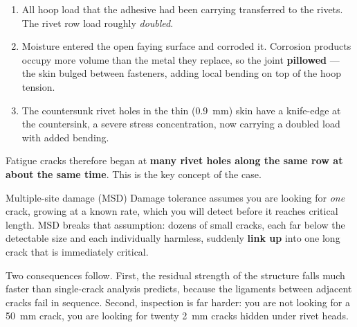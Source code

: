 \documentclass[11pt,a4paper]{article}
\begin{document}
\begin{enumerate}[nosep]
  \item All hoop load that the adhesive had been carrying transferred to the rivets. The rivet row load roughly \emph{doubled}.
  \item Moisture entered the open faying surface and corroded it. Corrosion products occupy more volume than the metal they replace, so the joint \textbf{pillowed} --- the skin bulged between fasteners, adding local bending on top of the hoop tension.
  \item The countersunk rivet holes in the thin (\SI{0.9}{mm}) skin have a knife-edge at the countersink, a severe stress concentration, now carrying a doubled load with added bending.
\end{enumerate}

Fatigue cracks therefore began at \textbf{many rivet holes along the same row at about the same time}. This is the key concept of the case.

\begin{aerobox}{Multiple-site damage (MSD)}
Damage tolerance assumes you are looking for \emph{one} crack, growing at a known rate, which you will detect before it reaches critical length. MSD breaks that assumption: dozens of small cracks, each far below the detectable size and each individually harmless, suddenly \textbf{link up} into one long crack that is immediately critical.

\medskip
Two consequences follow. First, the residual strength of the structure falls much faster than single-crack analysis predicts, because the ligaments between adjacent cracks fail in sequence. Second, inspection is far harder: you are not looking for a \SI{50}{mm} crack, you are looking for twenty \SI{2}{mm} cracks hidden under rivet heads.
\end{aerobox}
\end{document}
